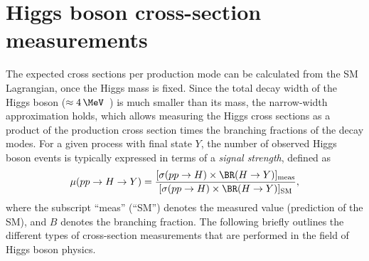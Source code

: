 \section{Higgs boson cross-section measurements}
\label{subsec:xsec-measurements}



The expected cross sections per production mode can be calculated from the SM Lagrangian, once the Higgs mass is fixed.
Since the total decay width of the Higgs boson ($\approx 4\,\MeV$~\cite{deFlorian:2016spz}) is much smaller than its mass, the narrow-width approximation holds, which allows measuring the Higgs cross sections as a product of the production cross section times the branching fractions of the decay modes.
For a given process with final state $Y$, the number of observed Higgs boson events is typically expressed in terms of a \emph{signal strength}, defined as 
\begin{equation}
  \label{eq:signal-strength}
  \mu(pp \to H \to Y) = \frac{ [ \sigma(pp \to H)  \times \BR(H \to Y) ]_\text{meas} } { [ \sigma(pp \to H) \times \BR(H \to Y) ]_\text{SM}},
\end{equation}
where the subscript ``meas'' (``SM'') denotes the measured value (prediction of the SM), and $B$ denotes the branching fraction. 
The following briefly outlines the different types of cross-section measurements that are performed in the field of Higgs boson physics. 


